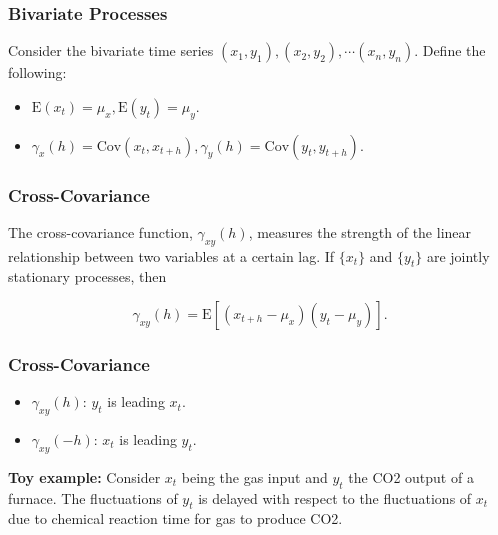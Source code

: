 \documentclass[%
xcolor=pdftex]{beamer}
\begin{document}







\begin{frame}
\frametitle{Bivariate Processes}

Consider the bivariate time series $(x_1,y_1), (x_2, y_2), \cdots (x_n, y_n)$. Define the following:

\begin{itemize}
\item $\mbox{E}(x_t) = \mu_x, \mbox{E}(y_t) = \mu_y$.
\item $\gamma_x (h) = \mbox{Cov}(x_t, x_{t+h}), \gamma_y (h) = \mbox{Cov}(y_t, y_{t+h})$.
\end{itemize}

\end{frame}

\begin{frame}
\frametitle{Cross-Covariance}

The cross-covariance function, $\gamma_{xy}(h)$, measures the strength of the linear relationship between two variables at a certain lag. If $\{x_t\}$ and $\{y_t\}$ are jointly stationary processes, then

\begin{equation} \label{eq:cov}
\gamma_{xy}(h) = \mbox{E}\left[ (x_{t+h} - \mu_x) (y_{t} - \mu_y) \right].
\end{equation}



\end{frame}






\begin{frame}
\frametitle{Cross-Covariance}

\begin{itemize}
\item $\gamma_{xy}(h)$: $y_t$ is leading $x_t$.
\item $\gamma_{xy}(-h)$: $x_t$ is leading $y_t$.
\end{itemize}

\vspace{5mm}

\textbf{Toy example:} Consider $x_t$ being the gas input and $y_t$ the CO2 output of a furnace. The fluctuations of $y_t$ is delayed with respect to the fluctuations of $x_t$ due to chemical reaction time for gas to produce CO2.

\end{frame}
\end{document}
